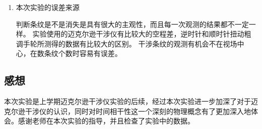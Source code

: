 \documentclass[a4paper]{article}
\begin{document}
\begin{changemargin}{1cm}{1cm}
\begin{spacing}{1.6}
\begin{enumerate}
            \item 本次实验的误差来源

                  判断条纹是不是消失是具有很大的主观性，而且每一次观测的结果都不一定一样。
                  实验使用的迈克尔逊干涉仪有比较大的空程差，逆时针和顺时针扭动粗调手轮所测得的数据有比较大的区别。
                  干涉条纹的观测有机会不在视场中心，在数条纹个数时容易有误差。
        \end{enumerate}
    \end{spacing}
    \subsection{感想}
    \begin{spacing}{1.6}
        \hspace{2em}本次实验是上学期迈克尔逊干涉仪实验的后续，经过本次实验进一步加深了对于迈克尔逊干涉仪的认识，同时对时间相干性这一个深刻的物理概念有了更加深入地体会。感谢老师在本次实验的指导，并且检查了实验中的数据。
    \end{spacing}










\end{changemargin}
\end{document}
